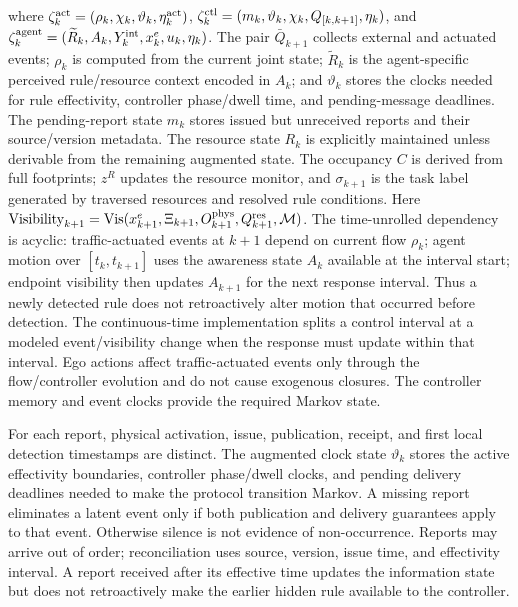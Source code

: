 \documentclass[letterpaper]{article} %
\begin{document}
where $\zeta_k^{\rm act}=(\rho_k,\chi_k,\vartheta_k,\eta_k^{\rm act})$, $\zeta_k^{\rm ctl}=(m_k,\vartheta_k,\chi_k,Q_{[k,k+1]},\eta_k)$, and $\zeta_k^{\rm agent}=(\widetilde R_k,A_k,Y_k^{\rm int},x_k^e,u_k,\eta_k)$. The pair $\bar Q_{k+1}$ collects external and actuated events; $\rho_k$ is computed from the current joint state; $\widetilde R_k$ is the agent-specific perceived rule/resource context encoded in $A_k$; and $\vartheta_k$ stores the clocks needed for rule effectivity, controller phase/dwell time, and pending-message deadlines. The pending-report state $m_k$ stores issued but unreceived reports and their source/version metadata. The resource state $R_k$ is explicitly maintained unless derivable from the remaining augmented state. The occupancy $C$ is derived from full footprints; $z^R$ updates the resource monitor, and $\sigma_{k+1}$ is the task label generated by traversed resources and resolved rule conditions. Here $\operatorname{Visibility}_{k+1}=\operatorname{Vis}(x_{k+1}^e,\Xi_{k+1},O_{k+1}^{\rm phys},Q_{k+1}^{\rm res},\mathcal M)$. The time-unrolled dependency is acyclic: traffic-actuated events at $k+1$ depend on current flow $\rho_k$; agent motion over $[t_k,t_{k+1}]$ uses the awareness state $A_k$ available at the interval start; endpoint visibility then updates $A_{k+1}$ for the next response interval. Thus a newly detected rule does not retroactively alter motion that occurred before detection. The continuous-time implementation splits a control interval at a modeled event/visibility change when the response must update within that interval. Ego actions affect traffic-actuated events only through the flow/controller evolution and do not cause exogenous closures. The controller memory and event clocks provide the required Markov state.

For each report, physical activation, issue, publication, receipt, and first local detection timestamps are distinct. The augmented clock state $\vartheta_k$ stores the active effectivity boundaries, controller phase/dwell clocks, and pending delivery deadlines needed to make the protocol transition Markov. A missing report eliminates a latent event only if both publication and delivery guarantees apply to that event. Otherwise silence is not evidence of non-occurrence. Reports may arrive out of order; reconciliation uses source, version, issue time, and effectivity interval. A report received after its effective time updates the information state but does not retroactively make the earlier hidden rule available to the controller.
\end{document}

